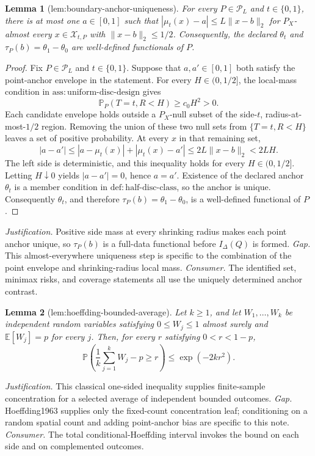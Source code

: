 \documentclass{article}
\newtheorem{lemma}{Lemma}
\begin{document}
\begin{lemma}[lem:boundary-anchor-uniqueness]\label{lem:boundary-anchor-uniqueness}
For every \(P\in\mathcal P_L\) and \(t\in\{0,1\}\), there is at most one \(a\in[0,1]\) such that \(|\mu_t(x)-a|\leq L\lVert x-b\rVert_2\) for \(P_X\)-almost every \(x\in\mathcal X_{t,P}\) with \(\lVert x-b\rVert_2\leq1/2\). Consequently, the declared \(\theta_t\) and \(\tau_P(b)=\theta_1-\theta_0\) are well-defined functionals of \(P\).
\end{lemma}
\begin{proof}
Fix \(P\in\mathcal P_L\) and \(t\in\{0,1\}\).  Suppose that \(a,a'\in[0,1]\) both satisfy the point-anchor envelope in the statement.  For every \(H\in(0,1/2]\), the local-mass condition in \(\mathrm{ass:uniform\text{-}disc\text{-}design}\) gives
\[
 \mathbb P_P(T=t,R<H)\geq c_0H^2>0.
\]
Each candidate envelope holds outside a \(P_X\)-null subset of the side-\(t\), radius-at-most-\(1/2\) region.  Removing the union of these two null sets from \(\{T=t,R<H\}\) leaves a set of positive probability.  At every \(x\) in that remaining set,
\[
 |a-a'|
 \leq |a-\mu_t(x)|+|\mu_t(x)-a'|
 \leq 2L\lVert x-b\rVert_2
 <2LH.
\]
The left side is deterministic, and this inequality holds for every \(H\in(0,1/2]\).  Letting \(H\downarrow0\) yields \(|a-a'|=0\), hence \(a=a'\).  Existence of the declared anchor \(\theta_t\) is a member condition in \(\mathrm{def:half\text{-}disc\text{-}class}\), so the anchor is unique.  Consequently \(\theta_t\), and therefore \(\tau_P(b)=\theta_1-\theta_0\), is a well-defined functional of \(P\).
\end{proof}
\par\smallskip\noindent \textit{Justification.} Positive side mass at every shrinking radius makes each point anchor unique, so \(\tau_P(b)\) is a full-data functional before \(I_\Delta(Q)\) is formed. \textit{Gap.} This almost-everywhere uniqueness step is specific to the combination of the point envelope and shrinking-radius local mass. \textit{Consumer.} The identified set, minimax risks, and coverage statements all use the uniquely determined anchor contrast.

\begin{lemma}[lem:hoeffding-bounded-average]\label{lem:hoeffding-bounded-average}
Let \(k\geq1\), and let \(W_1,\ldots,W_k\) be independent random variables satisfying \(0\leq W_j\leq1\) almost surely and \(\mathbb E[W_j]=p\) for every \(j\).  Then, for every \(r\) satisfying \(0<r<1-p\),
\[
 \mathbb P\!\left(\frac1k\sum_{j=1}^kW_j-p\geq r\right)\leq\exp(-2kr^2).
\]
\end{lemma}
\par\smallskip\noindent \textit{Justification.} This classical one-sided inequality supplies finite-sample concentration for a selected average of independent bounded outcomes. \textit{Gap.} Hoeffding1963 supplies only the fixed-count concentration leaf; conditioning on a random spatial count and adding point-anchor bias are specific to this note. \textit{Consumer.} The total conditional-Hoeffding interval invokes the bound on each side and on complemented outcomes.
\end{document}
